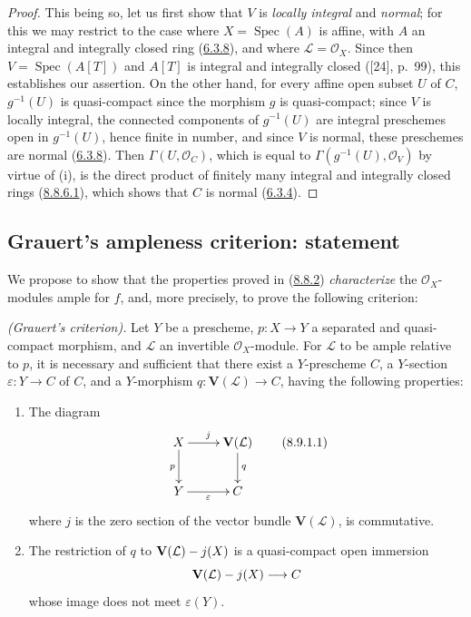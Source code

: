 \begin{proof}
This being so, let us first show that $V$ is \emph{locally integral} and
\emph{normal}; for this we may restrict to the case where $X=\operatorname{Spec}(A)$
is affine, with $A$ an integral and integrally closed ring
(\hyperref[II.6.3.8]{6.3.8}), and where
$\mathcal{L}=\mathcal{O}_X$. Since then
$V=\operatorname{Spec}(A[T])$ and $A[T]$ is integral and integrally closed
([24], p.~99), this establishes our assertion. On the other hand, for every
affine open subset $U$ of $C$, $g^{-1}(U)$ is quasi-compact since the morphism
$g$ is quasi-compact; since $V$ is locally integral, the connected components
of $g^{-1}(U)$ are integral preschemes open in $g^{-1}(U)$, hence finite in
number, and since $V$ is normal, these preschemes are normal
(\hyperref[II.6.3.8]{6.3.8}). Then $\Gamma(U,\mathcal{O}_C)$, which is equal
to $\Gamma(g^{-1}(U),\mathcal{O}_V)$ by virtue of (i), is the direct product
of finitely many integral and integrally closed rings
(\hyperref[II.8.8.6.1]{8.8.6.1}), which shows that $C$ is normal
(\hyperref[II.6.3.4]{6.3.4}).
\end{proof}

\subsection{Grauert's ampleness criterion: statement}
\label{subsection:II.8.9}

We propose to show that the properties proved in
(\hyperref[II.8.8.2]{8.8.2}) \emph{characterize} the
$\mathcal{O}_X$-modules ample for $f$, and, more precisely, to prove the
following criterion:

\begin{theorem}[8.9.1]
\label{II.8.9.1}
\emph{(Grauert's criterion).} Let $Y$ be a prescheme,
$p:X\to Y$ a separated and quasi-compact morphism, and $\mathcal{L}$ an
invertible $\mathcal{O}_X$-module. For $\mathcal{L}$ to be ample
relative to $p$, it is necessary and sufficient that there exist a
$Y$-prescheme $C$, a $Y$-section $\varepsilon:Y\to C$ of $C$, and a
$Y$-morphism $q:\mathbf{V}(\mathcal{L})\to C$, having the following
properties:
\begin{enumerate}
  \item[\rm{(i)}] The diagram
  \begin{equation}
  \label{II.8.9.1.1}
    \xymatrix{
      X\ar[r]^{j}\ar[d]_{p} & \mathbf{V}(\mathcal{L})\ar[d]^{q}\\
      Y\ar[r]_{\varepsilon} & C
    }
  \tag{8.9.1.1}
  \end{equation}
  where $j$ is the zero section of the vector bundle $\mathbf{V}(\mathcal{L})$,
  is commutative.
  \item[\rm{(ii)}] The restriction of $q$ to
  $\mathbf{V}(\mathcal{L})- j(X)$ is a quasi-compact open immersion
  \[
    \mathbf{V}(\mathcal{L})- j(X)\longrightarrow C
  \]
  whose image does not meet $\varepsilon(Y)$.
\end{enumerate}
\end{theorem}

